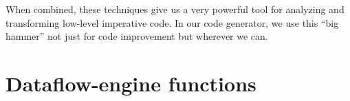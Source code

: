 \documentclass[blockstyle,preprint,nocopyrightspace]{sigplanconf}
\begin{document}
When combined, these techniques give us a very powerful tool for
analyzing and transforming low-level imperative code.
In our code generator, 
we use this ``big hammer'' not just for code improvement but wherever
we can.


\makeatother

\providecommand\includeftpref{\relax} %


\clearpage

\appendix

\section{Dataflow-engine functions}
\end{document}
